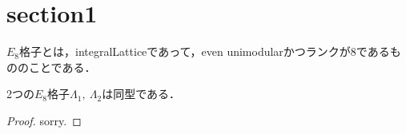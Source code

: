%

\section{section1}

\begin{definition}
  \label{def:E8Lattice}
  \leanok
  $E_8$格子とは，integralLatticeであって，even unimodularかつランクが$8$であるもののことである．
\end{definition}

\begin{theorem}
  \label{thm:unique}
  \leanok
  2つの$E_8$格子$\Lambda_1,\ \Lambda_2$は同型である．
\end{theorem}

\begin{proof}
  \leanok
  sorry.
\end{proof}

